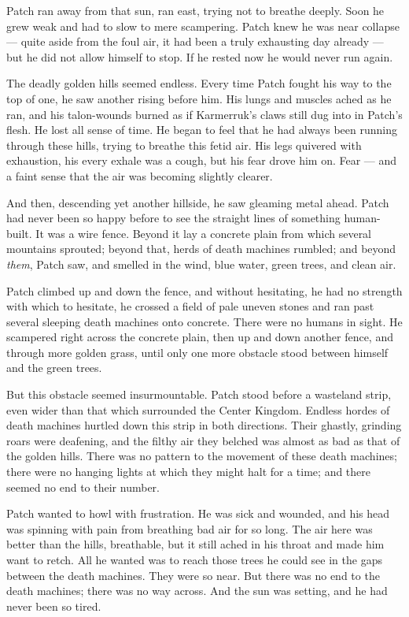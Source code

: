 \documentclass[12pt]{book}
\begin{document}
Patch ran away from that sun, ran east, trying not to breathe deeply. Soon he grew weak and had to slow to mere scampering. Patch knew he was near collapse ---
quite aside from the foul air, it had been a truly exhausting day already ---
but he did not allow himself to stop. If he rested now he would never run again.

The deadly golden hills seemed endless. Every time Patch fought his way to the top of one, he saw another rising before him. His lungs and muscles ached as he ran, and his talon-wounds burned as if Karmerruk's claws still dug into in Patch's flesh. He lost all sense of time. He began to feel that he had always been running through these hills, trying to breathe this fetid air. His legs quivered with exhaustion, his every exhale was a cough, but his fear drove him on. Fear ---
and a faint sense that the air was becoming slightly clearer.

And then, descending yet another hillside, he saw gleaming metal ahead. Patch had never been so happy before to see the straight lines of something human-built. It was a wire fence. Beyond it lay a concrete plain from which several mountains sprouted; beyond that, herds of death machines rumbled; and beyond {\it them}, Patch saw, and smelled in the wind, blue water, green trees, and clean air.

Patch climbed up and down the fence, and without hesitating, he had no strength with which to hesitate, he crossed a field of pale uneven stones and ran past several sleeping death machines onto concrete. There were no humans in sight. He scampered right across the concrete plain, then up and down another fence, and through more golden grass, until only one more obstacle stood between himself and the green trees.

But this obstacle seemed insurmountable. Patch stood before a wasteland strip, even wider than that which surrounded the Center Kingdom. Endless hordes of death machines hurtled down this strip in both directions. Their ghastly, grinding roars were deafening, and the filthy air they belched was almost as bad as that of the golden hills. There was no pattern to the movement of these death machines; there were no hanging lights at which they might halt for a time; and there seemed no end to their number.

Patch wanted to howl with frustration. He was sick and wounded, and his head was spinning with pain from breathing bad air for so long. The air here was better than the hills, breathable, but it still ached in his throat and made him want to retch. All he wanted was to reach those trees he could see in the gaps between the death machines. They were so near. But there was no end to the death machines; there was no way across. And the sun was setting, and he had never been so tired.
\end{document}
